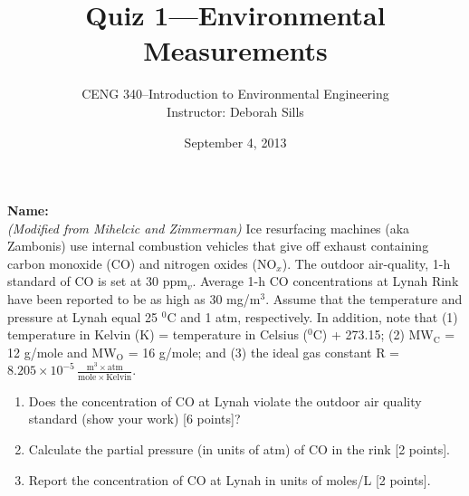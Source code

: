 \documentclass[12pt,letterpaper]{article}
\begin{document}
\setlength{\parindent}{0cm} 


\frenchspacing


\title {\Large Quiz 1---Environmental Measurements} 
\author {CENG 340--Introduction to Environmental Engineering\\
Instructor: Deborah Sills}
\date {September 4, 2013}
\maketitle


\vspace{-0.2 in}
\textbf{Name:}\\

\emph{(Modified from Mihelcic and Zimmerman)} Ice resurfacing machines (aka Zambonis) use internal combustion vehicles that give off exhaust containing carbon monoxide (CO) and nitrogen oxides (NO$_x$).  The outdoor air-quality, 1-h standard of CO is set at 30 ppm$_v$. Average 1-h CO concentrations at Lynah Rink have been reported to be as high as 30 mg/m$^3$. Assume that the temperature and pressure at Lynah equal 25 $^0$C and 1 atm, respectively.  In addition, note that (1) temperature in Kelvin (K) = temperature in Celsius ($^0$C) + 273.15; (2) MW$\mathrm{_C}$ = 12 g/mole and MW$\mathrm{_O}$ = 16 g/mole; and (3) the ideal gas constant R = $8.205\times 10^{-5}\, \mathrm{\frac{m^3 \times atm}{mole \times Kelvin}}$. 


\begin{enumerate}

\item Does the concentration of CO at Lynah violate the outdoor air quality standard (show your work) [6 points]?
\vspace{3.4 in}

\item Calculate the partial pressure (in units of atm) of CO in the rink [2 points]. 

\vspace{1.0 in}

\item Report the concentration of CO at Lynah in units of moles/L [2 points].

\end{enumerate}
\end{document}
